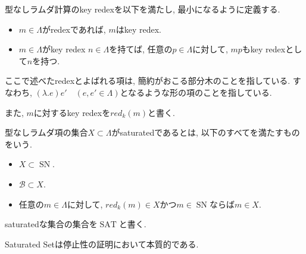 \documentclass[12pt, titlepage]{ltjsarticle}
\DeclareMathOperator{\SN}{SN}
\DeclareMathOperator{\SAT}{SAT}
\begin{document}
\begin{defn}
 型なしラムダ計算のkey redexを以下を満たし, 最小になるように定義する.
 \begin{itemize}
  \item $m \in \Lambda$がredexであれば, $m$はkey redex.
  \item $m \in \Lambda$がkey redex $n \in \Lambda$を持てば, 任意の$p \in \Lambda$に対して, $m p$もkey redexとして$n$を持つ.
 \end{itemize}
ここで述べたredexとよばれる項は, 簡約がおこる部分木のことを指している. すなわち, $(\lambda. e) e' \quad (e, e' \in \Lambda)$となるような形の項のことを指している.
 
また, $m$に対するkey redexを$red_k(m)$と書く.
\end{defn}

\begin{defn}\label{ss}
 型なしラムダ項の集合$X \subset \Lambda$がsaturatedであるとは, 以下のすべてを満たすものをいう.
 \begin{itemize}
  \item $X \subset \SN$.
  \item $\mathcal{B} \subset X$.
  \item 任意の$m \in \Lambda$に対して, $red_k(m) \in X$かつ$m \in \SN$ならば$m \in X$.
 \end{itemize}
 saturatedな集合の集合を$\SAT$と書く.
\end{defn}

\begin{rem}
 Saturated Setは停止性の証明において本質的である.
\end{rem}
\end{document}
